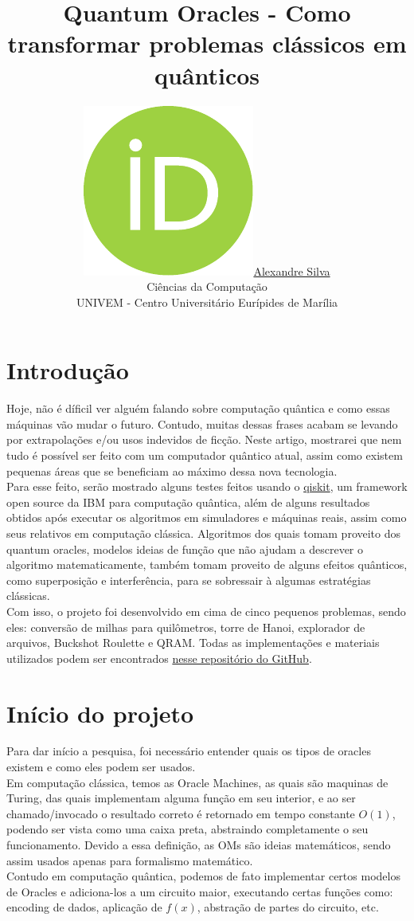 \documentclass{article}
\title{Quantum Oracles - Como transformar problemas clássicos em quânticos}
\date{}
\author{ \href{https://orcid.org/0009-0008-9134-5974}{\includegraphics[scale=0.06]{orcid.pdf}\hspace{1mm}Alexandre Silva}\\
	Ciências da Computação\\
	UNIVEM - Centro Universitário Eurípides de Marília\\
}
\begin{document}
\maketitle

\begin{abstract}
	
\end{abstract}


\section{Introdução}
Hoje, não é díficil ver alguém falando sobre computação quântica e como essas máquinas vão mudar o futuro. Contudo, muitas dessas frases acabam se levando por extrapolações e/ou usos indevidos de ficção. Neste artigo, mostrarei que nem tudo é possível ser feito com um computador quântico atual, assim como existem pequenas áreas que se beneficiam ao máximo dessa nova tecnologia.\\
Para esse feito, serão mostrado alguns testes feitos usando o \href{https://www.ibm.com/quantum/qiskit}{qiskit}, um framework open source da IBM para computação quântica, além de alguns resultados obtidos após executar os algoritmos em simuladores e máquinas reais, assim como seus relativos em computação clássica. Algoritmos dos quais tomam proveito dos quantum oracles, modelos ideias de função que não ajudam a descrever o algoritmo matematicamente, também tomam proveito de alguns efeitos quânticos, como superposição e interferência, para se sobressair à algumas estratégias clássicas.\\
Com isso, o projeto foi desenvolvido em cima de cinco pequenos problemas, sendo eles: conversão de milhas para quilômetros, torre de Hanoi, explorador de arquivos, Buckshot Roulette e QRAM. Todas as implementações e materiais utilizados podem ser encontrados \href{https://github.com/Dpbm/scientific-initiation-1-quantum-oracles}{nesse repositório do GitHub}.


\section{Início do projeto}
Para dar início a pesquisa, foi necessário entender quais os tipos de oracles existem e como eles podem ser usados.\\
Em computação clássica, temos as Oracle Machines, as quais são maquinas de Turing, das quais implementam alguma função em seu interior, e ao ser chamado/invocado o resultado correto é retornado em tempo constante $O(1)$, podendo ser vista como uma caixa preta, abstraindo completamente o seu funcionamento. Devido a essa definição, as OMs são ideias matemáticos, sendo assim usados apenas para formalismo matemático.\\
Contudo em computação quântica, podemos de fato implementar certos modelos de Oracles e adiciona-los a um circuito maior, executando certas funções como: encoding de dados, aplicação de $f(x)$, abstração de partes do circuito, etc.
\end{document}
